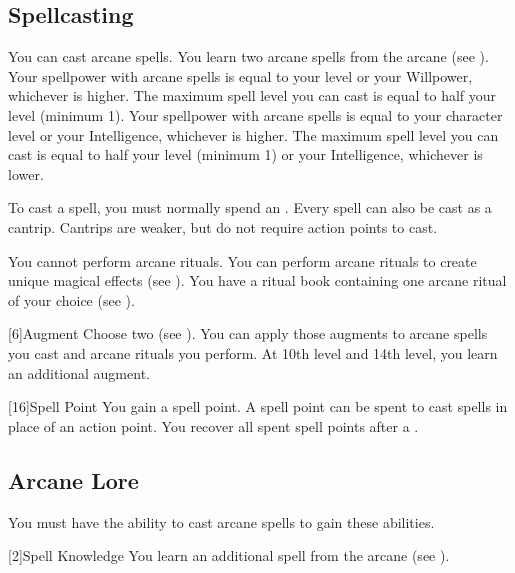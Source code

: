     \subsection{Spellcasting}

        You can cast arcane spells.
        You learn two arcane spells from the arcane  (see ).
         Your spellpower with arcane spells is equal to your level or your Willpower, whichever is higher.
        The maximum spell level you can cast is equal to half your level (minimum 1).
         Your spellpower with arcane spells is equal to your character level or your Intelligence, whichever is higher.
        The maximum spell level you can cast is equal to half your level (minimum 1) or your Intelligence, whichever is lower.

        To cast a spell, you must normally spend an .
        Every spell can also be cast as a cantrip.
        Cantrips are weaker, but do not require action points to cast.

         You cannot perform arcane rituals.
         You can perform arcane rituals to create unique magical effects (see ).
        You have a ritual book containing one arcane ritual of your choice (see ).

        [6]{Augment}
        Choose two  (see ).
        You can apply those augments to arcane spells you cast and arcane rituals you perform.
        At 10th level and 14th level, you learn an additional augment.

        [16]{Spell Point}
        You gain a spell point.
        A spell point can be spent to cast spells in place of an action point.
        You recover all spent spell points after a .

    \subsection{Arcane Lore}
        You must have the ability to cast arcane spells to gain these abilities.

        [2]{Spell Knowledge} 
        You learn an additional spell from the arcane  (see ).

